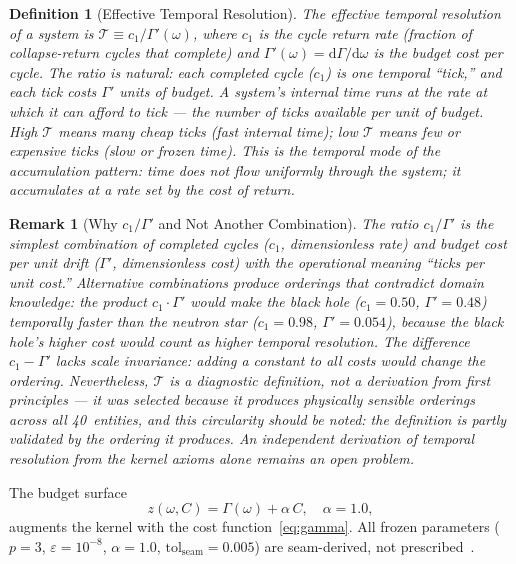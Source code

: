 \documentclass[
  aps,
  prd,
  twocolumn,
  superscriptaddress,
  nofootinbib,
  floatfix
]{revtex4-2}
\newtheorem{definition}[theorem]{Definition}
\newtheorem{remark}{Remark}
\newcommand{\Gam}{\Gamma}
\newcommand{\eps}{\varepsilon}
\newcommand{\tolseam}{\mathrm{tol}_{\mathrm{seam}}}
\newcommand{\dd}{\mathrm{d}}
\newcommand{\beq}{\begin{equation}}
\newcommand{\eeq}{\end{equation}}
\begin{document}
\begin{definition}[Effective Temporal Resolution]\label{def:temporal}
The \emph{effective temporal resolution} of a system is
$\mathcal{T} \equiv c_1 / \Gam'(\omega)$,
where $c_1$ is the cycle return rate (fraction of
collapse-return cycles that complete) and $\Gam'(\omega) =
\dd\Gam/\dd\omega$ is the budget cost per cycle.  The ratio
is natural: each completed cycle ($c_1$) is one temporal
``tick,'' and each tick costs $\Gam'$ units of budget.  A
system's internal time runs at the rate at which it can
afford to tick --- the number of ticks available per unit of
budget.  High $\mathcal{T}$ means many cheap ticks (fast
internal time); low $\mathcal{T}$ means few or expensive
ticks (slow or frozen time).  This is the temporal mode of
the accumulation pattern: time does not flow uniformly
through the system; it accumulates at a rate set by the cost
of return.
\end{definition}

\begin{remark}[Why $c_1/\Gam'$ and Not Another Combination]
\label{rem:temporal_choice}
The ratio $c_1/\Gam'$ is the simplest combination of
completed cycles ($c_1$, dimensionless rate) and budget cost
per unit drift ($\Gam'$, dimensionless cost) with the
operational meaning ``ticks per unit cost.''
Alternative combinations produce orderings that contradict
domain knowledge: the product $c_1 \cdot \Gam'$ would make
the black hole ($c_1 = 0.50$, $\Gam' = 0.48$) temporally
\emph{faster} than the neutron star ($c_1 = 0.98$,
$\Gam' = 0.054$), because the black hole's higher cost
would count as higher temporal resolution.  The difference
$c_1 - \Gam'$ lacks scale invariance: adding a constant to
all costs would change the ordering.  Nevertheless,
$\mathcal{T}$ is a \emph{diagnostic definition}, not a
derivation from first principles --- it was selected because
it produces physically sensible orderings across all
40~entities, and this circularity should be noted: the
definition is partly validated by the ordering it produces.
An independent derivation of temporal resolution from the
kernel axioms alone remains an open problem.
\end{remark}

The budget surface
\beq\label{eq:surface}
  z(\omega, C) = \Gam(\omega) + \alpha \, C,
  \quad \alpha = 1.0,
\eeq
augments the kernel with the cost function~\eqref{eq:gamma}.
All frozen parameters ($p = 3$, $\eps = 10^{-8}$,
$\alpha = 1.0$, $\tolseam = 0.005$) are seam-derived, not
prescribed~\cite{paulus2025episteme}.
\end{document}
